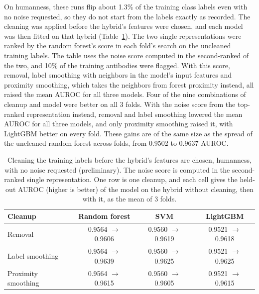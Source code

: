 On humanness, these runs flip about 1.3\% of the training class labels even with no noise requested, so they do not start from the labels exactly as recorded. The cleaning was applied before the hybrid's features were chosen, and each model was then fitted on that hybrid (Table~\ref{tab:ch6prelim_humanness}). The two single representations were ranked by the random forest's score in each fold's search on the uncleaned training labels. The table uses the noise score computed in the second-ranked of the two, and 10\% of the training antibodies were flagged. With this score, removal, label smoothing with neighbors in the model's input features and proximity smoothing, which takes the neighbors from forest proximity instead, all raised the mean AUROC for all three models. Four of the nine combinations of cleanup and model were better on all 3 folds. With the noise score from the top-ranked representation instead, removal and label smoothing lowered the mean AUROC for all three models, and only proximity smoothing raised it, with LightGBM better on every fold. These gains are of the same size as the spread of the uncleaned random forest across folds, from 0.9502 to 0.9637 AUROC.

\begin{table}[htbp]
\centering
\small
\begin{tabular}{@{}lccc@{}}
\toprule
Cleanup & Random forest & SVM & LightGBM \\
\midrule
Removal & 0.9564 $\rightarrow$ 0.9606 & 0.9560 $\rightarrow$ 0.9619 & 0.9521 $\rightarrow$ 0.9618 \\
Label smoothing & 0.9564 $\rightarrow$ 0.9639 & 0.9560 $\rightarrow$ 0.9625 & 0.9521 $\rightarrow$ 0.9625 \\
Proximity smoothing & 0.9564 $\rightarrow$ 0.9615 & 0.9560 $\rightarrow$ 0.9605 & 0.9521 $\rightarrow$ 0.9615 \\
\bottomrule
\end{tabular}
\caption[Cleaning before the hybrid's features are chosen, humanness (preliminary).]{Cleaning the training labels before the hybrid's features are chosen, humanness, with no noise requested (preliminary). The noise score is computed in the second-ranked single representation. One row is one cleanup, and each cell gives the held-out AUROC (higher is better) of the model on the hybrid without cleaning, then with it, as the mean of 3 folds.}
\label{tab:ch6prelim_humanness}
\end{table}


